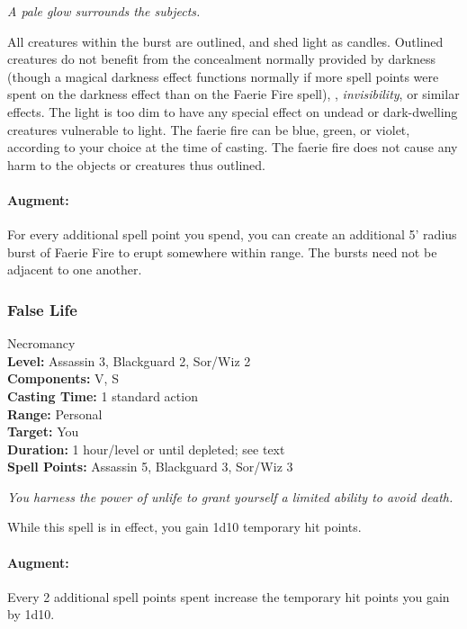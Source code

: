 \emph{A pale glow surrounds the subjects.} 

All creatures within the burst are outlined, and shed light as candles. 
Outlined creatures do not benefit from the concealment normally provided by darkness (though a magical darkness effect functions normally if more spell points were spent on the darkness effect than on the Faerie Fire spell), , \emph{invisibility}, or similar effects. 
The light is too dim to have any special effect on undead or dark-dwelling creatures vulnerable to light. 
The faerie fire can be blue, green, or violet, according to your choice at the time of casting. 
The faerie fire does not cause any harm to the objects or creatures thus outlined.

\paragraph{Augment:} For every additional spell point you spend, you can create an additional 5' radius burst of Faerie Fire to erupt somewhere within range. The bursts need not be adjacent to one another.
\subsubsection{False Life}
\label{Spell:FalseLife}
Necromancy
\\ \textbf{Level:} Assassin 3, Blackguard 2, Sor/Wiz 2
\\ \textbf{Components:} V, S
\\ \textbf{Casting Time:} 1 standard action
\\ \textbf{Range:} Personal
\\ \textbf{Target:} You
\\ \textbf{Duration:} 1 hour/level or until depleted; see text
\\ \textbf{Spell Points:} Assassin 5, Blackguard 3, Sor/Wiz 3

\emph{You harness the power of unlife to grant yourself a limited ability to avoid death.} 

While this spell is in effect, you gain 1d10 temporary hit points.

\paragraph{Augment:} Every 2 additional spell points spent increase the temporary hit points you gain by 1d10.


